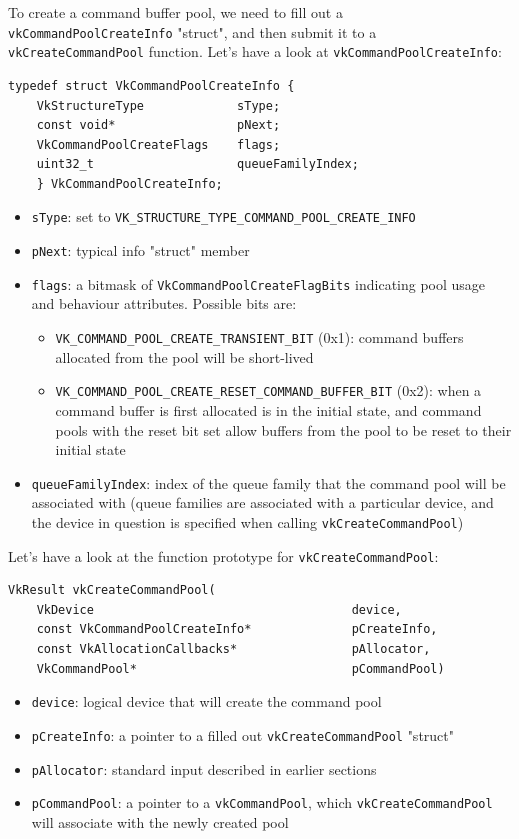 \documentclass[12pt,letterpaper]{article}
\newcommand{\cil}[1]{\texttt{#1}}
\begin{document}
	To create a command buffer pool, we need to fill out a \cil{vkCommandPoolCreateInfo} "struct", and then submit it to a \cil{vkCreateCommandPool} function. Let's have a look at \cil{vkCommandPoolCreateInfo}:
	\begin{verbatim}
typedef struct VkCommandPoolCreateInfo {
	VkStructureType             sType;
	const void*                 pNext;
	VkCommandPoolCreateFlags    flags;
	uint32_t                    queueFamilyIndex;
	} VkCommandPoolCreateInfo;
	\end{verbatim}
		\begin{itemize}
			\item \cil{sType}: set to \cil{VK_STRUCTURE_TYPE_COMMAND_POOL_CREATE_INFO}
			
			\item \cil{pNext}: typical info "struct" member
			
			\item \cil{flags}: a bitmask of \cil{VkCommandPoolCreateFlagBits} indicating pool usage and behaviour attributes. Possible bits are:
				\begin{itemize}
					\item \cil{VK_COMMAND_POOL_CREATE_TRANSIENT_BIT} (0x1): command buffers allocated from the pool will be short-lived
					
					\item \cil{VK_COMMAND_POOL_CREATE_RESET_COMMAND_BUFFER_BIT} (0x2): when a command buffer is first allocated is in the initial state, and command pools with the reset bit set allow buffers from the pool to be reset to their initial state
				\end{itemize}
			
			\item \cil{queueFamilyIndex}: index of the queue family that the command pool will be associated with (queue families are associated with a particular device, and the device in question is specified when calling \cil{vkCreateCommandPool})
		\end{itemize}
	Let's have a look at the function prototype for \cil{vkCreateCommandPool}:
		\begin{verbatim}
VkResult vkCreateCommandPool(
	VkDevice                                    device,
	const VkCommandPoolCreateInfo*              pCreateInfo,
	const VkAllocationCallbacks*                pAllocator,
	VkCommandPool*                              pCommandPool)
		\end{verbatim}
		\begin{itemize}
			\item \cil{device}: logical device that will create the command pool
			
			\item \cil{pCreateInfo}: a pointer to a filled out \cil{vkCreateCommandPool} "struct"
			
			\item \cil{pAllocator}: standard input described in earlier sections
			
			\item \cil{pCommandPool}: a pointer to a \cil{vkCommandPool}, which \cil{vkCreateCommandPool} will associate with the newly created pool
		\end{itemize}
\end{document}
